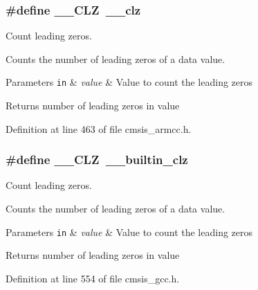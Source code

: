 \subsubsection[{\texorpdfstring{\+\_\+\+\_\+\+C\+LZ}{__CLZ}}]{\setlength{\rightskip}{0pt plus 5cm}\#define \+\_\+\+\_\+\+C\+LZ~\+\_\+\+\_\+clz}\hypertarget{group___c_m_s_i_s___core___instruction_interface_ga5d5bb1527e042be4a9fa5a33f65cc248}{}\label{group___c_m_s_i_s___core___instruction_interface_ga5d5bb1527e042be4a9fa5a33f65cc248}


Count leading zeros. 

Counts the number of leading zeros of a data value. 
\begin{DoxyParams}[1]{Parameters}
\mbox{\tt in}  & {\em value} & Value to count the leading zeros \\
\hline
\end{DoxyParams}
\begin{DoxyReturn}{Returns}
number of leading zeros in value 
\end{DoxyReturn}


Definition at line 463 of file cmsis\+\_\+armcc.\+h.

\subsubsection[{\texorpdfstring{\+\_\+\+\_\+\+C\+LZ}{__CLZ}}]{\setlength{\rightskip}{0pt plus 5cm}\#define \+\_\+\+\_\+\+C\+LZ~\+\_\+\+\_\+builtin\+\_\+clz}\hypertarget{group___c_m_s_i_s___core___instruction_interface_ga5d5bb1527e042be4a9fa5a33f65cc248}{}\label{group___c_m_s_i_s___core___instruction_interface_ga5d5bb1527e042be4a9fa5a33f65cc248}


Count leading zeros. 

Counts the number of leading zeros of a data value. 
\begin{DoxyParams}[1]{Parameters}
\mbox{\tt in}  & {\em value} & Value to count the leading zeros \\
\hline
\end{DoxyParams}
\begin{DoxyReturn}{Returns}
number of leading zeros in value 
\end{DoxyReturn}


Definition at line 554 of file cmsis\+\_\+gcc.\+h.

